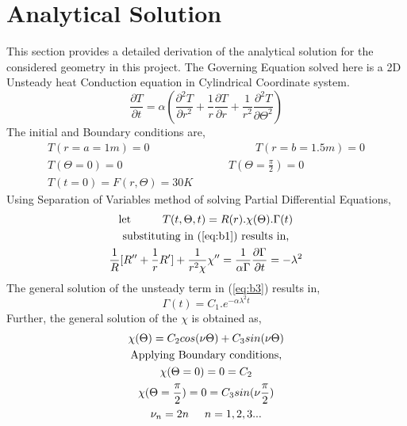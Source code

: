 \chapter{Analytical Solution}
\label{app:bb}

This section provides a detailed derivation of the analytical solution for the considered geometry in this project.
The Governing Equation solved here is a 2D Unsteady heat Conduction equation in Cylindrical Coordinate system.
\begin{equation}
    \label{eq:b1}
    \frac{\partial T}{\partial t} = \alpha (\frac{\partial^2 T}{\partial r^2}+\frac{1}{r}\frac{\partial T}{\partial r}+\frac{1}{r^2}\frac{\partial^2 T}{\partial \Theta^2})
\end{equation}
The initial and Boundary conditions are,
\begin{equation}
    \label{eq:b2}
    \begin{gathered}
    T(r=a=1m)=0 \hspace{4cm}T(r=b=1.5m)=0\\
    T(\Theta=0)=0 \hspace{4cm}T(\Theta=\frac{\pi}{2})=0\\
    T(t=0)=F(r,\Theta)=30K
    \end{gathered}
\end{equation}
Using Separation of Variables method of solving Partial Differential Equations,
\begin{equation}
    \label{eq:b3}
    \begin{gathered}
    $let$ \hspace{1cm}T(t,\Theta,t)=R(r).\chi(\Theta).\Gamma(t)\\
    $substituting in (\ref{eq:b1}) results in,$\\
    \frac{1}{R}[R''+\frac{1}{r}R']+\frac{1}{r^2\chi}\chi''=\frac{1}{\alpha\Gamma}\frac{\partial \Gamma}{\partial t}=-\lambda^2
    \end{gathered}
\end{equation}
The general solution of the unsteady term in (\ref{eq:b3}) results in,
\begin{equation}
    \label{eq:b4}
    \Gamma(t)=C_1.e^{-\alpha {\lambda^2} t}
\end{equation}
Further, the general solution of the $\chi$ is obtained as,
\begin{equation}
    \label{eq:b5}
    \begin{gathered}
    \chi(\Theta)=C_2cos(\nu\Theta)+C_3sin(\nu\Theta)\\
    $Applying Boundary conditions,$\\
    \chi(\Theta=0)=0=C_2\\
    \chi(\Theta=\frac{\pi}{2})=0=C_3sin(\nu\frac{\pi}{2})\\
    \nu_n=2n\hspace{0.5cm} n=1,2,3...\\
    \end{gathered}
\end{equation}

